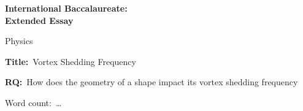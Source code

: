 \documentclass[a4paper]{report}
\begin{document}
\begin{titlepage}
    \begin{center}
            {\LARGE \textbf{International Baccalaureate: \\[0.2cm]
            Extended Essay}}
            \vspace{0.6cm}
            
            {\Large Physics}

            \vspace*{4cm}

            {\LARGE\textbf{Title:}\ Vortex Shedding Frequency}
            \vspace{1cm}

            {\Large\textbf{RQ:}\ How does the geometry of a shape impact its vortex shedding frequency}
            \vspace{4cm}

            {\large Word count:\ \ldots}
            \vfill

            \vspace{0.1cm}
    \end{center}
\end{titlepage}

\tableofcontents
\listoffigures


\appendix

\end{document}

